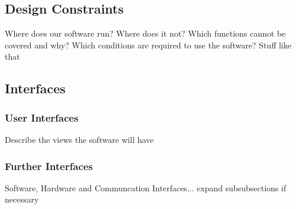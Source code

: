 \subsection{Design Constraints}
\label{sec:domainBd}
Where does our software run? Where does it not? Which functions cannot be covered and why? Which conditions are required to use the software? Stuff like that

\subsection{Interfaces}
\label{sec:domainBe}
\subsubsection{User Interfaces}
\label{sec:domainBea}
Describe the views the software will have
\subsubsection{Further Interfaces}
\label{sec:domainBeb}
Software, Hardware and Communcation Interfaces... expand subsubsections if necessary

